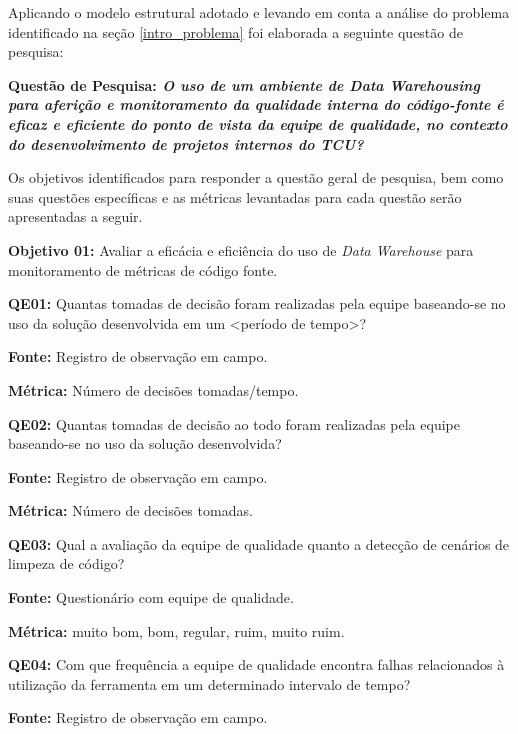 Aplicando o modelo estrutural adotado e levando em conta a análise do problema identificado na seção \ref{intro_problema} foi elaborada a seguinte questão de pesquisa:

\textbf{Questão de Pesquisa: \textit{O uso de um ambiente de Data Warehousing para aferição e monitoramento da qualidade interna do código-fonte é eficaz e eficiente do ponto de vista da equipe de qualidade, no contexto do desenvolvimento de projetos internos do TCU?}}

Os objetivos identificados para responder a questão geral de pesquisa, bem como suas questões específicas e as métricas levantadas para cada questão serão apresentadas a seguir.

\textbf{Objetivo 01:} Avaliar a eficácia e eficiência do uso de \textit{Data Warehouse} para monitoramento de métricas de código fonte. \newline


\textbf{QE01:} Quantas tomadas de decisão foram realizadas pela equipe baseando-se no uso da solução desenvolvida em um <período de tempo>?

\textbf{Fonte:} Registro de observação em campo.

\textbf{Métrica:} Número de decisões tomadas/tempo. \newline


\textbf{QE02: } Quantas tomadas de decisão ao todo foram realizadas pela equipe baseando-se no uso da solução desenvolvida?

\textbf{Fonte:} Registro de observação em campo.

\textbf{Métrica:} Número de decisões tomadas. \newline



\textbf{QE03: } Qual a avaliação da equipe de qualidade quanto a detecção de cenários de limpeza de código?

\textbf{Fonte:} Questionário com equipe de qualidade.

\textbf{Métrica:} muito bom, bom, regular, ruim, muito ruim. \newline


\textbf{QE04: } Com que frequência a equipe de qualidade encontra falhas relacionados à utilização da ferramenta em um determinado intervalo de tempo?

\textbf{Fonte:} Registro de observação em campo.

